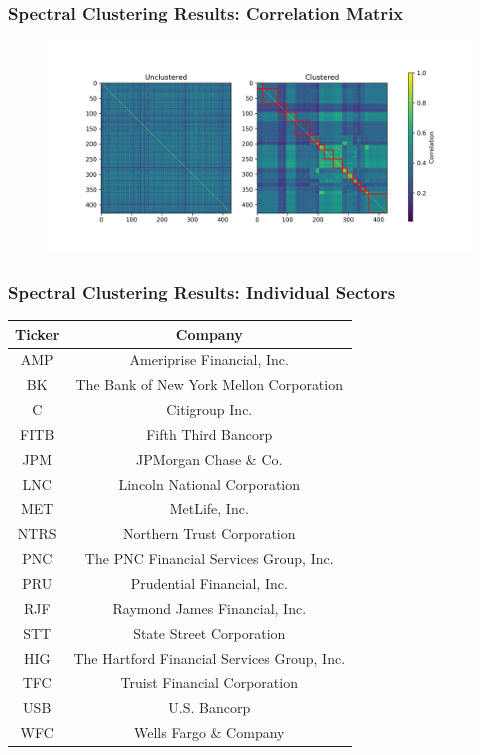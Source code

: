 \documentclass{beamer}
\begin{document}
\begin{frame}
    \frametitle{Spectral Clustering Results: Correlation Matrix}
    \begin{figure}[H]
        \centering
        \includegraphics[width=\linewidth]{../clustered_corr.png}
    \end{figure}
\end{frame}
\begin{frame}
    \frametitle{Spectral Clustering Results: Individual Sectors}
    \begin{table}
        \centering
        \begin{tabular}{|c|c|}
            \hline 
            Ticker & Company \\
            \hline
            AMP & Ameriprise Financial, Inc. \\
            BK & The Bank of New York Mellon Corporation \\
            C & Citigroup Inc. \\
            FITB & Fifth Third Bancorp \\
            JPM & JPMorgan Chase \& Co. \\
            LNC & Lincoln National Corporation \\
            MET & MetLife, Inc. \\
            NTRS & Northern Trust Corporation \\
            PNC & The PNC Financial Services Group, Inc. \\
            PRU & Prudential Financial, Inc. \\
            RJF & Raymond James Financial, Inc. \\
            STT & State Street Corporation \\
            HIG & The Hartford Financial Services Group, Inc. \\
            TFC & Truist Financial Corporation \\
            USB & U.S. Bancorp \\
            WFC & Wells Fargo \& Company \\
            \hline
        \end{tabular}
        \label{tab:clusters7}
    \end{table}
\end{frame}
\end{document}
